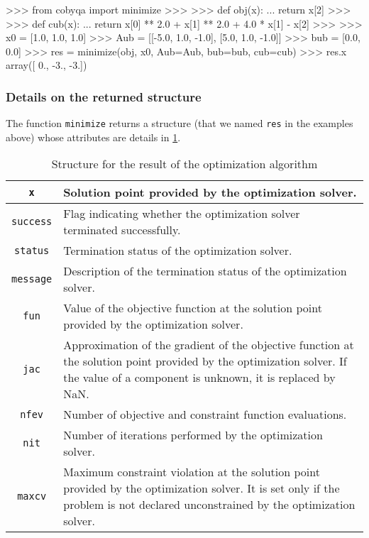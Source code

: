 \begin{lstpython}[%
    caption=An example of \gls{cobyqa} with nonlinear constraints,
    label=lst:cobyqa-problem-g,
]
    >>> from cobyqa import minimize
    >>>
    >>> def obj(x):
    ...     return x[2]
    >>>
    >>> def cub(x):
    ...     return x[0] ** 2.0 + x[1] ** 2.0 + 4.0 * x[1] - x[2] 
    >>>
    >>> x0 = [1.0, 1.0, 1.0]
    >>> Aub = [[-5.0, 1.0, -1.0], [5.0, 1.0, -1.0]]
    >>> bub = [0.0, 0.0]
    >>> res = minimize(obj, x0, Aub=Aub, bub=bub, cub=cub)
    >>> res.x
    array([ 0., -3., -3.])   
\end{lstpython}

\subsubsection{Details on the returned structure}

The function \texttt{minimize} returns a structure (that we named \texttt{res} in the examples above) whose attributes are details in \cref{tab:optimize-result}.

\begin{table}[ht]
    \caption{Structure for the result of the optimization algorithm}
    \label{tab:optimize-result}
    \centering
    \begin{tabularx}{\textwidth}{cX}
        \toprule
        \texttt{x}          & Solution point provided by the optimization solver.\\
        \midrule
        \texttt{success}    & Flag indicating whether the optimization solver terminated successfully.\\
        \midrule
        \texttt{status}     & Termination status of the optimization solver.\\
        \midrule
        \texttt{message}    & Description of the termination status of the optimization solver.\\
        \midrule
        \texttt{fun}        & Value of the objective function at the solution point provided by the optimization solver.\\
        \midrule
        \texttt{jac}        & Approximation of the gradient of the objective function at the solution point provided by the optimization solver. If the value of a component is unknown, it is replaced by NaN.\\
        \midrule
        \texttt{nfev}       & Number of objective and constraint function evaluations.\\
        \midrule
        \texttt{nit}        & Number of iterations performed by the optimization solver.\\
        \midrule
        \texttt{maxcv}      & Maximum constraint violation at the solution point provided by the optimization solver. It is set only if the problem is not declared unconstrained by the optimization solver.\\
        \bottomrule
    \end{tabularx}
\end{table}

